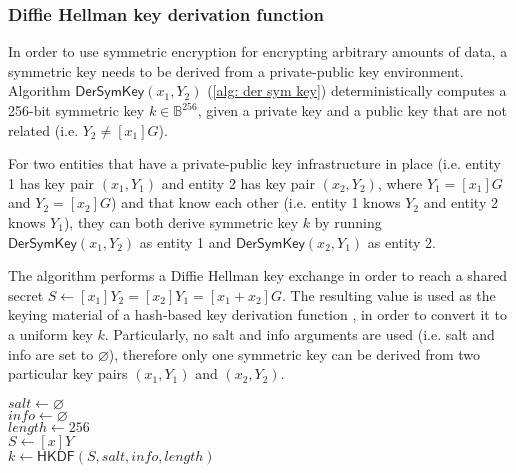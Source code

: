 \clearpage
\subsubsection{Diffie Hellman key derivation function} \label{app: diffie hellman key derivation function}
In order to use symmetric encryption for encrypting arbitrary amounts of data, a symmetric key needs to be derived from a private-public key environment. Algorithm $\mathsf{DerSymKey}(x_1, Y_2)$ (\cref{alg: der sym key}) deterministically computes a 256-bit symmetric key $k \in \mathbb{B}^{256}$, given a private key and a public key that are not related (i.e. $Y_2 \neq [x_1]G$).

For two entities that have a private-public key infrastructure in place (i.e. entity 1 has key pair $(x_1, Y_1)$ and entity 2 has key pair $(x_2, Y_2)$, where $Y_1 = [x_1]G$ and $Y_2 = [x_2]G$) and that know each other (i.e. entity 1 knows $Y_2$ and entity 2 knows $Y_1$), they can both derive symmetric key $k$ by running $\mathsf{DerSymKey}(x_1, Y_2)$ as entity 1 and $\mathsf{DerSymKey}(x_2, Y_1)$ as entity 2.

The algorithm performs a Diffie Hellman key exchange in order to reach a shared secret $S \gets [x_1]Y_2 = [x_2]Y_1 = [x_1 + x_2]G$. The resulting value is used as the keying material of a hash-based key derivation function \cite{RFC5869}, in order to convert it to a uniform key $k$. Particularly, no salt and info arguments are used (i.e. salt and info are set to $\varnothing$), therefore only one symmetric key can be derived from two particular key pairs $(x_1, Y_1)$ and $(x_2, Y_2)$.

\begin{algorithm}[ht]
    \DontPrintSemicolon
    \caption{$\mathsf{DerSymKey}(x, Y)$}
    \label{alg: der sym key}
    
    $salt \gets \varnothing$ \\
    $info \gets \varnothing$ \\
    $length \gets 256$ \\
    $S \gets [x]Y$ \\
    $k \gets \mathsf{HKDF}(S, salt, info, length)$ \\
     
\end{algorithm}
